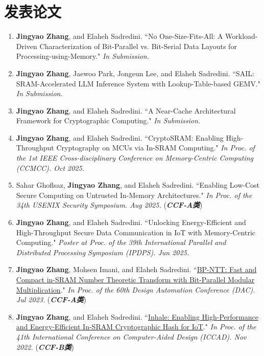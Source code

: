 \documentclass{resume}
\begin{document}
\section{发表论文}
\begin{enumerate}[label=\arabic*., itemsep=1pt, topsep=3pt]
    \item \textbf{Jingyao Zhang}, and Elaheh Sadredini. ``No One-Size-Fits-All: A Workload-Driven Characterization of Bit-Parallel vs. Bit-Serial Data Layouts for Processing-using-Memory." \textit{In Submission.}

    \item \textbf{Jingyao Zhang}, Jaewoo Park, Jongeun Lee, and Elaheh Sadredini. ``SAIL: SRAM-Accelerated LLM Inference System with Lookup-Table-based GEMV." \textit{In Submission.}

    \item \textbf{Jingyao Zhang}, and Elaheh Sadredini. ``A Near-Cache Architectural Framework for Cryptographic Computing." \textit{In Submission.}

    \item \textbf{Jingyao Zhang}, and Elaheh Sadredini. ``CryptoSRAM: Enabling High-Throughput Cryptography on MCUs via In-SRAM Computing." \textit{In Proc. of the 1st IEEE Cross-disciplinary Conference on Memory-Centric Computing (CCMCC). Oct 2025.}

    \item Sahar Ghoflsaz, \textbf{Jingyao Zhang}, and Elaheh Sadredini. ``Enabling Low-Cost Secure Computing on Untrusted In-Memory Architectures." \textit{In Proc. of the 34th USENIX Security Symposium. Aug 2025.} (\textbf{\textit{CCF-A类}})

    \item \textbf{Jingyao Zhang}, and Elaheh Sadredini. ``Unlocking Energy-Efficient and High-Throughput Secure Data Communication in IoT with Memory-Centric Computing." \textit{Poster at Proc. of the 39th International Parallel and Distributed Processing Symposium (IPDPS). Jun 2025.}

    \item \textbf{Jingyao Zhang}, Mohsen Imani, and Elaheh Sadredini. ``\href{https://arxiv.org/pdf/2303.00173.pdf}{BP-NTT: Fast and Compact in-SRAM Number Theoretic Transform with Bit-Parallel Modular Multiplication}." \textit{In Proc. of the 60th Design Automation Conference (DAC). Jul 2023.} (\textbf{\textit{CCF-A类}})

    \item \textbf{Jingyao Zhang}, and Elaheh Sadredini. ``\href{https://arxiv.org/pdf/2208.07570.pdf}{Inhale: Enabling High-Performance and Energy-Efficient In-SRAM Cryptographic Hash for IoT}." \textit{In Proc. of the 41th International Conference on Computer-Aided Design (ICCAD). Nov 2022.} (\textbf{\textit{CCF-B类}})


\end{enumerate}
\end{document}
